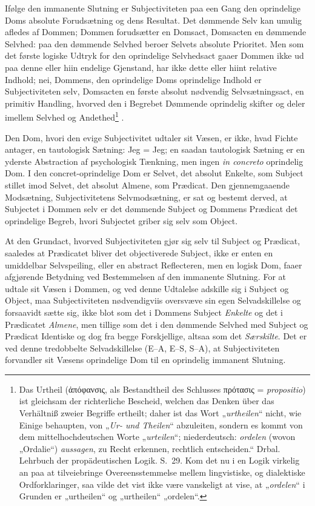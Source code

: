 \documentclass[12pt]{book}
\newcommand{\opage}[1]{\marginnote{\footnotesize\textit{[#1]}}}
\begin{document}
Ifølge den immanente Slutning er Subjectiviteten paa een Gang den oprindelige Doms absolute Forudsætning og dens Resultat. Det dømmende Selv kan umulig afledes af Dommen; Dommen forudsætter en Domsact, Domsacten en dømmende Selvhed: paa den dømmende Selvhed beroer Selvets absolute Prioritet. Men som det første logiske Udtryk for den oprindelige Selvhedsact gaaer Dommen ikke ud paa denne eller hiin endelige Gjenstand, har ikke dette eller hiint relative Indhold; nei, Dommens, den oprindelige Doms oprindelige Indhold er Subjectiviteten selv, Domsacten en første absolut nødvendig Selvsætningsact, en primitiv Handling, hvorved den i Begrebet Dømmende oprindelig skifter og deler imellem Selvhed og Andethed\footnote{Das Urtheil (ἀπόφανσις, als Bestandtheil des Schlusses πρότασις = \textit{propositio}) ist gleichsam der richterliche Bescheid, welchen das Denken über das Verhältniß zweier Begriffe ertheilt; daher ist das Wort „\emph{urtheilen}“ nicht, wie Einige behaupten, von „\emph{Ur- und Theilen}“ abzuleiten, sondern es kommt von dem mittelhochdeutschen Worte „\emph{urteilen}“; niederdeutsch: \emph{ordelen} (wovon „Ordalie“) \emph{aussagen}, zu Recht erkennen, rechtlich entscheiden.“ Drbal. Lehrbuch der propädeutischen Logik. S.~29. Kom det nu i en Logik virkelig an paa at tilveiebringe Overeensstemmelse mellem lingvistiske, og dialektiske Ordforklaringer, saa vilde det vist ikke være vanskeligt at vise, at „\emph{ordelen}“ i Grunden er „urtheilen“ og „urtheilen“ „ordelen“.}%
.

\opage{333}Den Dom, hvori den evige Subjectivitet udtaler sit Væsen, er ikke, hvad Fichte antager, en tautologisk Sætning: Jeg = Jeg; en saadan tautologisk Sætning er en yderste Abstraction af psychologisk Tænkning, men ingen \textit{in concreto} oprindelig Dom. I den concret-oprindelige Dom er Selvet, det absolut Enkelte, som Subject stillet imod Selvet, det absolut Almene, som Prædicat. Den gjennemgaaende Modsætning, Subjectivitetens Selvmodsætning, er sat og bestemt derved, at Subjectet i Dommen selv er det dømmende Subject og Dommens Prædicat det oprindelige Begreb, hvori Subjectet griber sig selv som Object.

At den Grundact, hvorved Subjectiviteten gjør sig selv til Subject og Prædicat, saaledes at Prædicatet bliver det objectiverede Subject, ikke er enten en umiddelbar Selvspeiling, eller en abstract Reflecteren, men en logisk Dom, faaer afgjørende Betydning ved Bestemmelsen af den immanente Slutning. For at udtale sit Væsen i Dommen, og ved denne Udtalelse adskille sig i Subject og Object, maa Subjectiviteten nødvendigviis oversvæve sin egen Selvadskillelse og forsaavidt sætte sig, ikke blot som det i Dommens Subject \emph{Enkelte} og det i Prædicatet \emph{Almene}, men tillige som det i den dømmende Selvhed med Subject og Prædicat Identiske og dog fra begge Forskjellige, altsaa som det \emph{Særskilte}. Det er ved denne tredobbelte Selvadskillelse (E--A, E--S, S--A), at Subjectiviteten forvandler sit Væsens oprindelige Dom til en oprindelig immanent Slutning.
\end{document}
